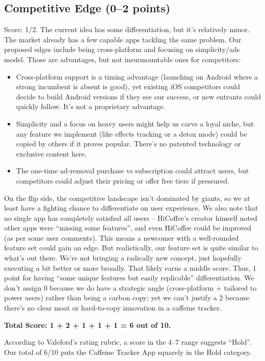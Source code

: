 \documentclass{article}
\begin{document}
\subsection{Competitive Edge (0–2 points)}
Score: 1/2. The current idea has some differentiation, but it’s relatively minor. The market already has a few capable apps tackling the same problem. Our proposed edges include being cross-platform and focusing on simplicity/ads model. Those are advantages, but not insurmountable ones for competitors:
\begin{itemize}
    \item Cross-platform support is a timing advantage (launching on Android where a strong incumbent is absent is good), yet existing iOS competitors could decide to build Android versions if they see our success, or new entrants could quickly follow. It’s not a proprietary advantage.
    \item Simplicity and a focus on heavy users might help us carve a loyal niche, but any feature we implement (like effects tracking or a detox mode) could be copied by others if it proves popular. There’s no patented technology or exclusive content here.
    \item The one-time ad-removal purchase vs subscription could attract users, but competitors could adjust their pricing or offer free tiers if pressured.
\end{itemize}
On the flip side, the competitive landscape isn’t dominated by giants, so we at least have a fighting chance to differentiate on user experience. We also note that no single app has completely satisfied all users – HiCoffee’s creator himself noted other apps were “missing some features”\footnotemark[3], and even HiCoffee could be improved (as per some user comments). This means a newcomer with a well-rounded feature set could gain an edge. But realistically, our feature set is quite similar to what’s out there. We’re not bringing a radically new concept, just hopefully executing a bit better or more broadly. That likely earns a middle score. Thus, 1 point for having “some unique features but easily replicable” differentiation\footnotemark[9]. We don’t assign 0 because we do have a strategic angle (cross-platform + tailored to power users) rather than being a carbon copy; yet we can’t justify a 2 because there’s no clear moat or hard-to-copy innovation in a caffeine tracker.

\textbf{Total Score: 1 + 2 + 1 + 1 + 1 = 6 out of 10.}

According to Valeford’s rating rubric, a score in the 4–7 range suggests “Hold”\footnotemark[9]. Our total of 6/10 puts the Caffeine Tracker App squarely in the Hold category.
\end{document}
